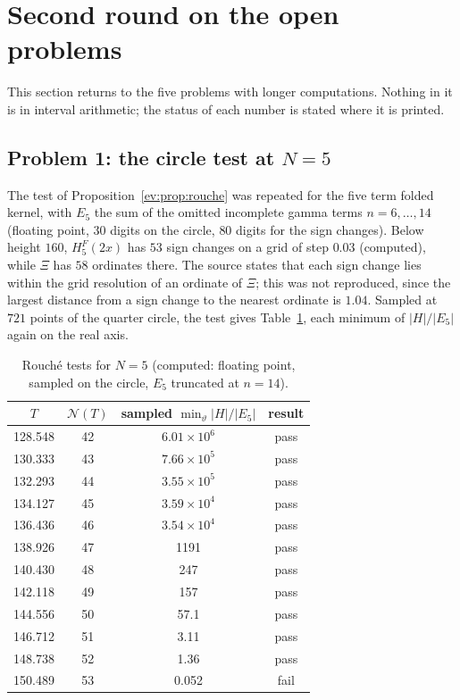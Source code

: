 \section{Second round on the open problems}\label{ev:sec:round2}

This section returns to the five problems with longer computations. Nothing in it is in interval arithmetic; the status of each number is stated where it is printed.

\subsection{Problem 1: the circle test at \texorpdfstring{$N=5$}{N=5}}
The test of Proposition~\ref{ev:prop:rouche} was repeated for the five term folded kernel, with $E_5$ the sum of the omitted incomplete gamma terms $n=6,\ldots,14$ (floating point, $30$ digits on the circle, $80$ digits for the sign changes). Below height $160$, $H^F_5(2x)$ has $53$ sign changes on a grid of step $0.03$ (computed), while $\Xi$ has $58$ ordinates there. The source states that each sign change lies within the grid resolution of an ordinate of $\Xi$; this was not reproduced, since the largest distance from a sign change to the nearest ordinate is $1.04$. Sampled at $721$ points of the quarter circle, the test gives Table~\ref{ev:tab:rouche5}, each minimum of $|H|/|E_5|$ again on the real axis.

\begin{table}[h]\centering\small
\begin{tabular}{cccc}
\toprule
$T$ & $\mathcal N(T)$ & sampled $\min_\vartheta|H|/|E_5|$ & result\\
\midrule
128.548 & 42 & $6.01\times10^6$ & pass\\
130.333 & 43 & $7.66\times10^5$ & pass\\
132.293 & 44 & $3.55\times10^5$ & pass\\
134.127 & 45 & $3.59\times10^4$ & pass\\
136.436 & 46 & $3.54\times10^4$ & pass\\
138.926 & 47 & 1191 & pass\\
140.430 & 48 & 247 & pass\\
142.118 & 49 & 157 & pass\\
144.556 & 50 & 57.1 & pass\\
146.712 & 51 & 3.11 & pass\\
148.738 & 52 & 1.36 & pass\\
150.489 & 53 & 0.052 & fail\\
\bottomrule
\end{tabular}
\caption{Rouch\'e tests for $N=5$ (computed: floating point, sampled on the circle, $E_5$ truncated at $n=14$).}\label{ev:tab:rouche5}
\end{table}

